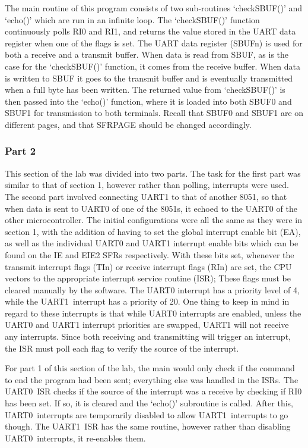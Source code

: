 \documentclass[12pt]{article}
\newcommand{\uz}{UART0}
\newcommand{\uo}{UART1}
\begin{document}
The main routine of this program consists of two sub-routines `checkSBUF()' and `echo()' which are run in an infinite loop. The `checkSBUF()' function continuously polls RI0 and RI1, and returns the value stored in the UART data register when one of the flags is set. The UART data register (SBUFn) is used for both a receive and a transmit buffer. When data is read from SBUF, as is the case for the `checkSBUF()' function, it comes from the receive buffer. When data is written to SBUF it goes to the transmit buffer and is eventually transmitted when a full byte has been written. The returned value from `checkSBUF()' is then passed into the `echo()' function, where it is loaded into both SBUF0 and SBUF1 for transmission to both terminals. Recall that SBUF0 and SBUF1 are on different pages, and that SFRPAGE should be changed accordingly. 

\subsubsection{Part 2}
This section of the lab was divided into two parts.
The task for the first part was similar to that of section 1, however rather than polling, interrupts were used. The second part involved connecting UART1 to that of another 8051, so that when data is sent to UART0 of one of the 8051s, it echoed to the UART0 of the other microcontroller. The initial configurations were all the same as they were in section 1, with the addition of having to set the global interrupt enable bit (EA), as well as the individual UART0 and UART1 interrupt enable bits which can be found on the IE and EIE2 SFRs respectively. With these bits set, whenever the transmit interrupt flags (TIn) or receive interrupt flags (RIn) are set, the CPU vectors to the appropriate interrupt service routine (ISR); These flags must be cleared manually by the software. The UART0 interrupt has a priority level of 4, while the \uo\ interrupt has a priority of 20. One thing to keep in mind in regard to these interrupts is that while UART0 interrupts are enabled, unless the UART0 and UART1 interrupt priorities are swapped, UART1 will not receive any interrupts. Since both receiving and transmitting will trigger an interrupt, the ISR must poll each flag to verify the source of the interrupt. 

For part 1 of this section of the lab, the main would only check if the command to end the program had been sent; everything else was handled in the ISRs. The \uz\ ISR checks if the source of the interrupt was a receive by checking if RI0 has been set. If so, it is cleared and the `echo()' subroutine is called. After this, \uz\ interrupts are temporarily disabled to allow \uo\ interrupts to go though. The \uo\ ISR has the same routine, however rather than disabling \uz\ interrupts, it re-enables them.
\end{document}
